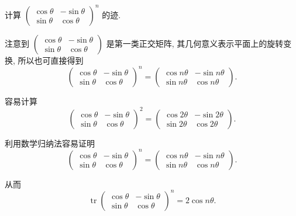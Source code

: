 \documentclass[../../main.tex]{subfiles}
\begin{document}
\begin{example}
计算 $\begin{pmatrix} \cos\theta & -\sin\theta \\ \sin\theta & \cos\theta \end{pmatrix}^n$ 的迹.
\end{example}
\begin{remark}
注意到 $\begin{pmatrix} \cos\theta & -\sin\theta \\ \sin\theta & \cos\theta \end{pmatrix}$ 是第一类正交矩阵, 其几何意义表示平面上的旋转变换, 所以也可直接得到
$$
\begin{pmatrix} \cos\theta & -\sin\theta \\ \sin\theta & \cos\theta \end{pmatrix}^n = \begin{pmatrix} \cos n\theta & -\sin n\theta \\ \sin n\theta & \cos n\theta \end{pmatrix}.
$$
\end{remark}
\begin{solution}
容易计算
$$
\begin{pmatrix} \cos\theta & -\sin\theta \\ \sin\theta & \cos\theta \end{pmatrix}^2 = \begin{pmatrix} \cos2\theta & -\sin2\theta \\ \sin2\theta & \cos2\theta \end{pmatrix}.
$$

利用数学归纳法容易证明
$$
\begin{pmatrix} \cos\theta & -\sin\theta \\ \sin\theta & \cos\theta \end{pmatrix}^n = \begin{pmatrix} \cos n\theta & -\sin n\theta \\ \sin n\theta & \cos n\theta \end{pmatrix}.
$$

从而
$$
\operatorname{tr}\begin{pmatrix} \cos\theta & -\sin\theta \\ \sin\theta & \cos\theta \end{pmatrix}^n = 2\cos n\theta.
$$

\end{solution}
\end{document}
